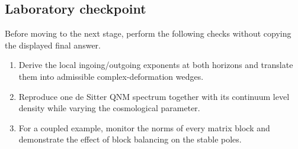 \subsection*{Laboratory checkpoint}
Before moving to the next stage, perform the following checks without copying
the displayed final answer.
\begin{enumerate}
  \item Derive the local ingoing/outgoing exponents at both horizons and translate them into admissible complex-deformation wedges.
  \item Reproduce one de Sitter QNM spectrum together with its continuum level density while varying the cosmological parameter.
  \item For a coupled example, monitor the norms of every matrix block and demonstrate the effect of block balancing on the stable poles.
\end{enumerate}
